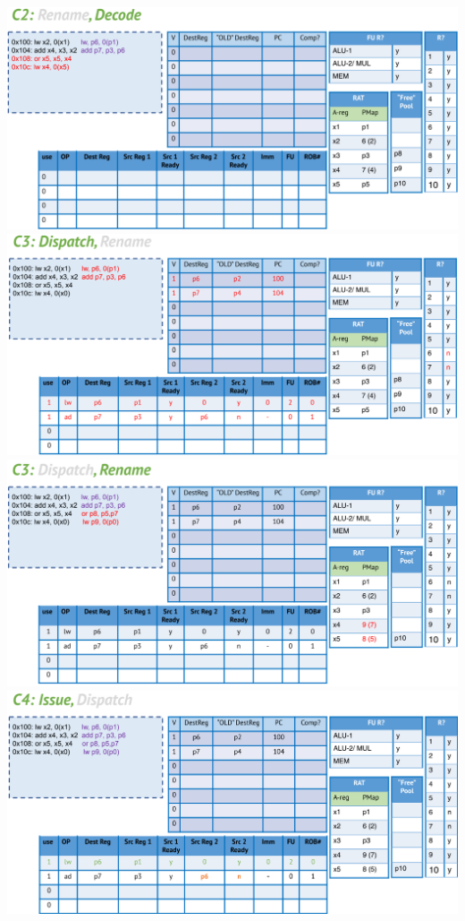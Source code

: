 \documentclass[10pt]{article}
\begin{document}
\begin{center}
\includegraphics*[width=\textwidth]{W5_out_of_order/4.png}\\
\includegraphics*[width=\textwidth]{W5_out_of_order/5.png}\\
\includegraphics*[width=\textwidth]{W5_out_of_order/6.png}\\
\includegraphics*[width=\textwidth]{W5_out_of_order/7.png}\\

\end{center}
\end{document}
